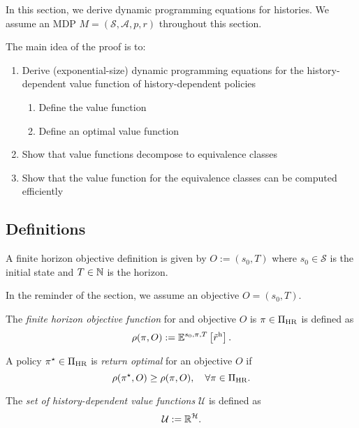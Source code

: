 In this section, we derive dynamic programming equations for histories. We assume an MDP $M = (\mathcal{S}, \mathcal{A}, p, r)$ throughout this section.

The main idea of the proof is to:
\begin{enumerate}
\item Derive (exponential-size) dynamic programming equations for the history-dependent value function of history-dependent policies
  \begin{enumerate}
    \item Define the value function
    \item Define an optimal value function
  \end{enumerate}
\item Show that value functions decompose to equivalence classes
\item Show that the value function for the equivalence classes can be computed efficiently
\end{enumerate}

\subsection{Definitions}

\begin{definition} \label{def:ObjectiveFH}
  A finite horizon objective definition is given by $O := (s_0, T)$ where $s_0\in \mathcal{S}$ is the initial state and $T\in \mathbb{N}$ is the horizon.
   \leanok
\end{definition}

In the reminder of the section, we assume an objective $O = (s_0, T)$.
\begin{definition} \label{sec:objective-fh}
  The \emph{finite horizon objective function} for and objective $O$ is $\pi\in \Pi_{\mathrm{HR}}$ is defined as
  \[
    \rho(\pi, O)
    :=
    \mathbb{E}^{s_0, \pi, T} \left[\tilde{r}^{\mathrm{h}} \right].
  \]
   \leanok
\end{definition}

\begin{definition}\label{def:optimal-fh}
  A policy $\pi^{\star}\in \Pi_{\mathrm{HR}}$ is \emph{return optimal} for an objective $O$ if
  \[
   \rho(\pi^{\star}, O) \ge \rho(\pi, O), \quad \forall \pi \in \Pi_{\mathrm{HR}}.
 \]
  \leanok
\end{definition}

\begin{definition} \label{def:values-h}
  The \emph{set of history-dependent value functions} $\mathcal{U}$ is defined as
  \[
   \mathcal{U} := \mathbb{R}^{\mathcal{H}}.
 \]
  \leanok
\end{definition}

